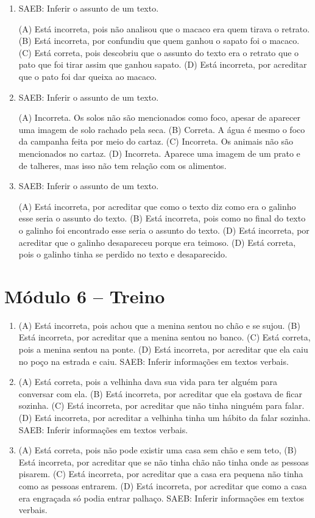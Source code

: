 \begin{enumerate}
\item
SAEB: Inferir o assunto de um texto.

(A) Está incorreta, pois não analisou que o macaco era quem tirava o retrato.
(B) Está incorreta, por confundiu que quem ganhou o sapato foi o macaco.
(C) Está correta, pois descobriu que o assunto do texto era o retrato
que o pato que foi tirar assim que ganhou sapato.
(D) Está incorreta, por acreditar que o pato foi dar queixa ao macaco.

\item
SAEB: Inferir o assunto de um texto.

(A) Incorreta. Os solos não são mencionados como foco, apesar de aparecer 
uma imagem de solo rachado pela seca.
(B) Correta. A água é mesmo o foco da campanha feita por meio do cartaz.
(C) Incorreta. Os animais não são mencionados no cartaz.
(D) Incorreta. Aparece uma imagem de um prato e de talheres, mas isso não 
tem relação com os alimentos.

\item
SAEB: Inferir o assunto de um texto.

(A) Está incorreta, por acreditar que como o texto diz como era o
galinho esse seria o assunto do texto.
(B) Está incorreta, pois como no final do texto o galinho foi encontrado
esse seria o assunto do texto.
(D) Está incorreta, por acreditar que o galinho desapareceu porque era
teimoso.
(D) Está correta, pois o galinho tinha se perdido no texto e
desaparecido.
\end{enumerate}

\section*{Módulo 6 – Treino}

\begin{enumerate}
\item
(A) Está incorreta, pois achou que a menina sentou no chão e se sujou.
(B) Está incorreta, por acreditar que a menina sentou no banco.
(C) Está correta, pois a menina sentou na ponte.
(D) Está incorreta, por acreditar que ela caiu no poço na estrada e caiu.
SAEB: Inferir informações em textos verbais.

\item
(A) Está correta, pois a velhinha dava sua vida para ter alguém para conversar com ela.
(B) Está incorreta, por acreditar que ela gostava de ficar sozinha.
(C) Está incorreta, por acreditar que não tinha ninguém para falar.
(D) Está incorreta, por acreditar a velhinha tinha um hábito da falar sozinha.
SAEB: Inferir informações em textos verbais.

\item
(A) Está correta, pois não pode existir uma casa sem chão e sem teto,
(B) Está incorreta, por acreditar que se não tinha chão não tinha onde
as pessoas pisarem.
(C) Está incorreta, por acreditar que a casa era pequena não tinha como
as pessoas entrarem.
(D) Está incorreta, por acreditar que como a casa era engraçada só podia
entrar palhaço.
SAEB: Inferir informações em textos verbais.
\end{enumerate}

